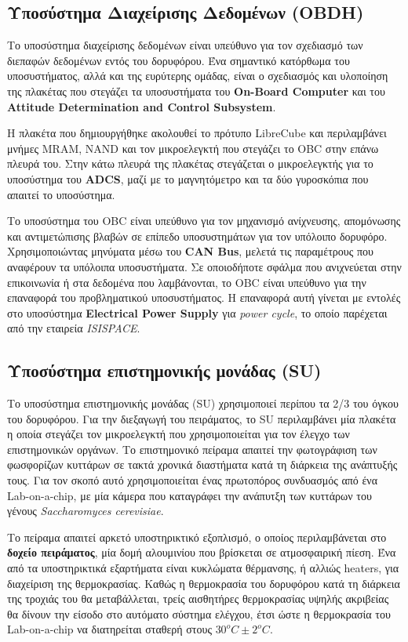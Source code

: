 \documentclass[a4paper,nobib,justified]{tufte-book}
\begin{document}
\subsection{Υποσύστημα Διαχείρισης Δεδομένων (\acs{OBDH})}
Το υποσύστημα διαχείρισης δεδομένων είναι υπεύθυνο για τον σχεδιασμό των διεπαφών δεδομένων εντός του δορυφόρου. Ένα σημαντικό κατόρθωμα του υποσυστήματος, αλλά και της ευρύτερης ομάδας, είναι ο σχεδιασμός και υλοποίηση της πλακέτας που στεγάζει τα υποσυστήματα του \textbf{On-Board Computer} και του \textbf{Attitude Determination and Control Subsystem}.

Η πλακέτα που δημιουργήθηκε ακολουθεί το πρότυπο LibreCube και περιλαμβάνει μνήμες MRAM, NAND και τον μικροελεγκτή που στεγάζει το OBC στην επάνω πλευρά του. Στην κάτω πλευρά της πλακέτας στεγάζεται ο μικροελεγκτής για το υποσύστημα του \textbf{ADCS}, μαζί με το μαγνητόμετρο και τα δύο γυροσκόπια που απαιτεί το υποσύστημα.

Το υποσύστημα του OBC είναι υπεύθυνο για τον μηχανισμό ανίχνευσης, απομόνωσης και αντιμετώπισης βλαβών σε επίπεδο υποσυστημάτων για τον υπόλοιπο δορυφόρο. Χρησιμοποιώντας μηνύματα μέσω του \textbf{CAN Bus}, μελετά τις παραμέτρους που αναφέρουν τα υπόλοιπα υποσυστήματα. Σε οποιοδήποτε σφάλμα που ανιχνεύεται στην επικοινωνία ή στα δεδομένα που λαμβάνονται, το OBC είναι υπεύθυνο για την επαναφορά του προβληματικού υποσυστήματος. Η επαναφορά αυτή γίνεται με εντολές στο υποσύστημα \textbf{Electrical Power Supply} για \emph{power cycle}, το οποίο παρέχεται από την εταιρεία \emph{ISISPACE}.

\subsection{Υποσύστημα επιστημονικής μονάδας (\acs{SU})}

Το υποσύστημα επιστημονικής μονάδας (SU) χρησιμοποιεί περίπου τα 2/3 του όγκου του δορυφόρου. Για την διεξαγωγή του πειράματος, το \acs{SU} περιλαμβάνει μία πλακέτα η οποία στεγάζει τον μικροελεγκτή που χρησιμοποιείται για τον έλεγχο των επιστημονικών οργάνων. Το επιστημονικό πείραμα απαιτεί την φωτογράφιση των φωσφορίζων κυττάρων σε τακτά χρονικά διαστήματα κατά τη διάρκεια της ανάπτυξής τους. Για τον σκοπό αυτό χρησιμοποιείται ένας πρωτοπόρος συνδυασμός από ένα Lab-on-a-chip, με μία κάμερα που καταγράφει την ανάπυτξη των κυττάρων του γένους \textit{Saccharomyces cerevisiae}.

Το πείραμα απαιτεί αρκετό υποστηρικτικό εξοπλισμό, ο οποίος περιλαμβάνεται στο \textbf{δοχείο πειράματος}, μία δομή αλουμινίου που βρίσκεται σε ατμοσφαιρική πίεση. Ένα από τα υποστηρικτικά εξαρτήματα είναι κυκλώματα θέρμανσης, ή αλλιώς heaters, για διαχείριση της θερμοκρασίας. Καθώς η θερμοκρασία του δορυφόρου κατά τη διάρκεια της τροχιάς του θα μεταβάλλεται, τρείς αισθητήρες θερμοκρασίας υψηλής ακριβείας θα δίνουν την είσοδο στο αυτόματο σύστημα ελέγχου, έτσι ώστε η θερμοκρασία του Lab-on-a-chip να διατηρείται σταθερή στους $30^o C \pm 2^oC$. %
\end{document}
